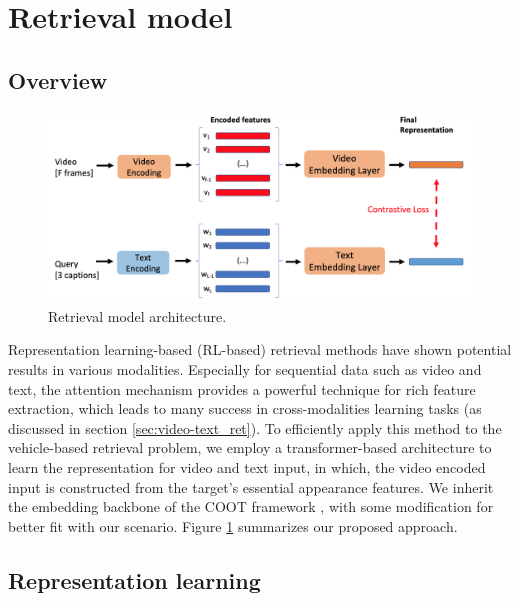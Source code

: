 \section{Retrieval model}
\label{sec:retrieval_model}
\subsection{Overview}
\begin{figure}[!htb]
    \centering
    \includegraphics[width=\linewidth]{resources/images/methods/retrieval_model.png}
    \caption{Retrieval model architecture.}
    \label{fig:ret_overview}
\end{figure}
Representation learning-based (RL-based) retrieval methods have shown potential results in various modalities. 
Especially for sequential data such as video and text, the attention mechanism provides a powerful technique for rich feature extraction, which leads to many success in cross-modalities learning tasks (as discussed in section \ref{sec:video-text_ret}). 
To efficiently apply this method to the vehicle-based retrieval problem, we employ a transformer-based architecture to learn the representation for video and text input, in which, the video encoded input is constructed from the target's essential appearance features. 
We inherit the embedding backbone of the COOT framework \cite{ging2020coot}, with some modification for better fit with our scenario.
Figure \ref{fig:ret_overview} summarizes our proposed approach.

\subsection{Representation learning}
